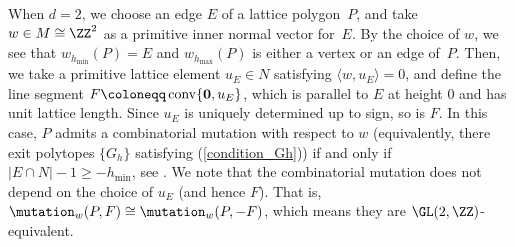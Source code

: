 \begin{Remark}[the combinatorial mutation for the case of $d=2$]\label{rem_def_mutation}
When $d=2$, we choose an edge $E$ of a lattice polygon~$P$, and take $w\in M\cong\ZZ^2$ as a primitive inner normal vector for~$E$.
By the choice of $w$, we see that $w_{h_{\min}}(P)=E$ and $w_{h_{\max}}(P)$ is either a vertex or an edge of~$P$.
Then, we take a primitive lattice element $u_E\in N$ satisfying $\langle w,u_E \rangle=0$, and define the line segment $F\coloneqq\operatorname{conv}\{{\bf 0},u_E\}$,
which is parallel to $E$ at height $0$ and has unit lattice length. Since $u_E$ is uniquely determined up to sign, so is $F$.
In this case, $P$ admits a combinatorial mutation with respect to $w$ (equivalently, there exit polytopes $\{G_h\}$ satisfying (\ref{condition_Gh})) if and only if $|E\cap N|-1\ge -h_{\min}$, see \cite[Lemma~1]{KNP}.
We note that the combinatorial mutation does not depend on the choice of $u_E$ (and hence $F$). That is,
$\mutation_w(P,F)\cong\mutation_w(P,-F)$, which means they are $\GL(2,\ZZ)$-equivalent.
\end{Remark}
